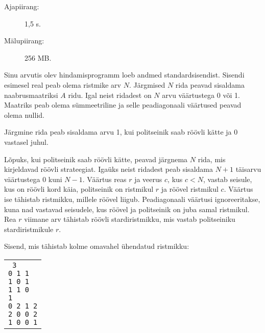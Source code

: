 \documentclass{boi2014-et}
\begin{document}
    \Constraints

    \begin{description}
        \item[Ajapiirang:] 1,5 s.
        \item[Mälupiirang:] 256 MB.
    \end{description}

    \Experimentation

    Sinu arvutis olev hindamisprogramm loeb andmed standardsisendist.
    Sisendi esimesel real peab olema ristmike arv $N$.
    Järgmised $N$ rida peavad sisaldama naabrusmaatriksi $A$ ridu.
    Igal neist ridadest on $N$ arvu väärtustega 0 või 1.
    Maatriks peab olema sümmeetriline ja selle peadiagonaali väärtused peavad olema nullid.

    Järgmine rida peab sisaldama arvu 1, kui politseinik saab röövli kätte ja 0 vastasel juhul.

    Lõpuks, kui politseinik saab röövli kätte, peavad järgnema $N$ rida,
    mis kirjeldavad röövli strateegiat.
    Igaüks neist ridadest peab sisaldama $N+1$ täisarvu väärtustega $0$ kuni $N-1$.
    Väärtus reas $r$ ja veerus $c$, kus $c < N$, vastab seisule,
    kus on röövli kord käia, politseinik on ristmikul $r$ ja röövel ristmikul $c$.
    Väärtus ise tähistab ristmikku, millele röövel liigub.
    Peadiagonaali väärtusi ignoreeritakse, kuna nad vastavad seisudele,
    kus röövel ja politseinik on juba samal ristmikul.
    Rea $r$ viimane arv tähistab röövli stardiristmikku,
    mis vastab politseiniku stardiristmikule $r$.

    Sisend, mis tähistab kolme omavahel ühendatud ristmikku:
    \begin{center}
        \begin{tabular}{p{4cm}}
            {\tt
                3 \newline
                0 1 1 \newline
                1 0 1 \newline
                1 1 0 \newline
                1 \newline
                0 2 1 2 \newline
                2 0 0 2 \newline
                1 0 0 1 \newline
            }
        \end{tabular}
    \end{center}
\end{document}
